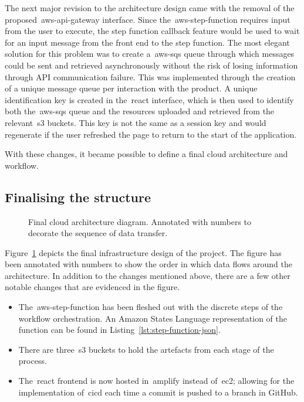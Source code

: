 The next major revision to the architecture design came with the removal of the proposed~\gls{aws-api-gateway} interface.
Since the~\gls{aws-step-function} requires input from the user to execute,
the step function callback feature would be used to wait for an input message from the front end to the step function.
The most elegant solution for this problem was
to create a~\gls{aws-sqs} queue through which messages could be sent
and retrieved asynchronously without the risk of losing information through API communication failure.
This was implemented through the creation of a unique message queue per interaction with the product.
A unique identification key is created in the~\gls{react} interface, which is then used
to identify both the~\gls{aws-sqs} queue and the resources uploaded and retrieved from the relevant~\gls{s3} buckets.
This key is not the same as a session key
and would regenerate if the user refreshed the page to return to the start of the application.

With these changes, it became possible to define a final cloud architecture and workflow.

\subsection{Finalising the structure}\label{subsec:finalising-the-structure}

\begin{figure}[!htb]
    \minipage{\textwidth}
    
    \caption{Final cloud architecture diagram. Annotated with numbers to decorate the sequence of data transfer.}\label{fig:final_design}
    \endminipage\hfill
\end{figure}

Figure~\ref{fig:final_design} depicts the final infrastructure design of the project.
The figure has been annotated with numbers to show the order in which data flows around the architecture.
In addition to the changes mentioned above, there are a few other notable changes that are evidenced in the figure.

\begin{itemize}
    \item The~\gls{aws-step-function} has been fleshed out with the discrete steps of the workflow orchestration.
    An Amazon States Language representation of the function can be found in Listing~\ref{lst:step-function-json}.
    \item There are three~\gls{s3} buckets to hold the artefacts from each stage of the process.
    \item The~\gls{react} frontend is now hosted in~\gls{amplify} instead of~\gls{ec2};
    allowing for the implementation of~\gls{cicd} each time a commit is pushed to a branch in GitHub.
\end{itemize}

